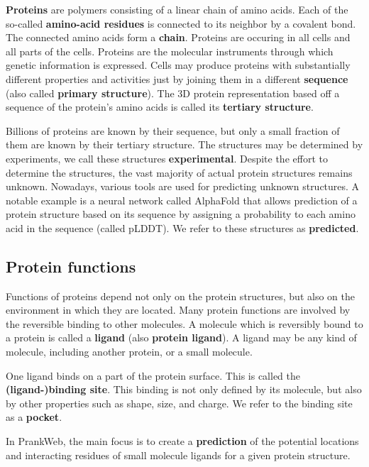 \textbf{Proteins} are polymers consisting of a linear chain of amino acids. Each of the so-called \textbf{amino-acid residues} is connected to its neighbor by a covalent bond. The connected amino acids form a \textbf{chain}. Proteins are occuring in all cells and all parts of the cells. Proteins are the molecular instruments through which genetic information is expressed. Cells may produce proteins with substantially different properties and activities just by joining them in a different \textbf{sequence} (also called \textbf{primary structure}). The 3D protein representation based off a sequence of the protein's amino acids is called its \textbf{tertiary structure}. \cite{nelson2008lehninger}

Billions of proteins are known by their sequence, but only a small fraction of them are known by their tertiary structure. The structures may be determined by experiments, we call these structures \textbf{experimental}. Despite the effort to determine the structures, the vast majority of actual protein structures remains unknown. Nowadays, various tools are used for predicting unknown structures. A notable example is a neural network called AlphaFold that allows prediction of a protein structure based on its sequence by assigning a probability to each amino acid in the sequence (called pLDDT). We refer to these structures as \textbf{predicted}. \cite{jumper2021highly}

\subsection{Protein functions}
\label{subsec:protein_functions}

Functions of proteins depend not only on the protein structures, but also on the environment in which they are located. Many protein functions are involved by the reversible binding to other molecules. A molecule which is reversibly bound to a protein is called a \textbf{ligand} (also \textbf{protein ligand}). A ligand may be any kind of molecule, including another protein, or a small molecule.

One ligand binds on a part of the protein surface. This is called the \textbf{(ligand-)binding site}. This binding is not only defined by its molecule, but also by other properties such as shape, size, and charge. We refer to the binding site as a \textbf{pocket}. \cite{nelson2008lehninger}

In PrankWeb, the main focus is to create a \textbf{prediction} of the potential locations and interacting residues of small molecule ligands for a given protein structure. 


